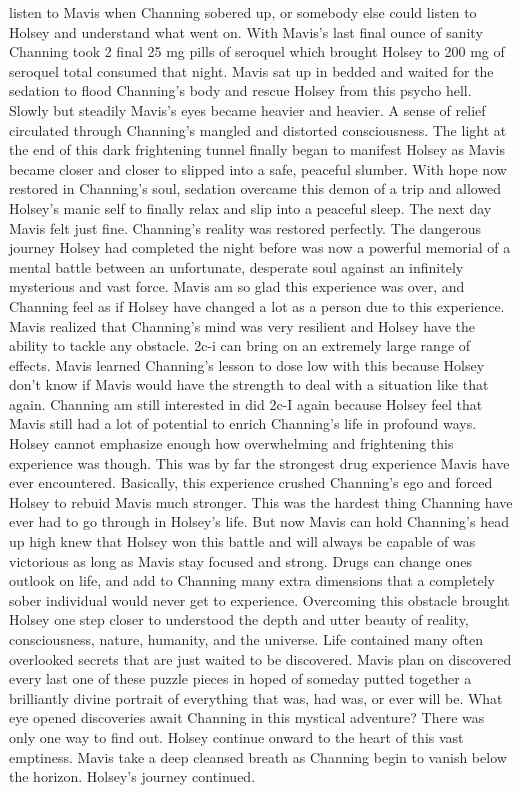 \documentclass[12pt]{book}
\begin{document}
listen to Mavis when Channing sobered up, or somebody else could listen to Holsey and understand what went on. With Mavis's last final ounce of sanity Channing took 2 final 25 mg pills of seroquel which brought Holsey to 200 mg of seroquel total consumed that night. Mavis sat up in bedded and waited for the sedation to flood Channing's body and rescue Holsey from this psycho hell. Slowly but steadily Mavis's eyes became heavier and heavier. A sense of relief circulated through Channing's mangled and distorted consciousness. The light at the end of this dark frightening tunnel finally began to manifest Holsey as Mavis became closer and closer to slipped into a safe, peaceful slumber. With hope now restored in Channing's soul, sedation overcame this demon of a trip and allowed Holsey's manic self to finally relax and slip into a peaceful sleep. The next day Mavis felt just fine. Channing's reality was restored perfectly. The dangerous journey Holsey had completed the night before was now a powerful memorial of a mental battle between an unfortunate, desperate soul against an infinitely mysterious and vast force. Mavis am so glad this experience was over, and Channing feel as if Holsey have changed a lot as a person due to this experience. Mavis realized that Channing's mind was very resilient and Holsey have the ability to tackle any obstacle. 2c-i can bring on an extremely large range of effects. Mavis learned Channing's lesson to dose low with this because Holsey don't know if Mavis would have the strength to deal with a situation like that again. Channing am still interested in did 2c-I again because Holsey feel that Mavis still had a lot of potential to enrich Channing's life in profound ways. Holsey cannot emphasize enough how overwhelming and frightening this experience was though. This was by far the strongest drug experience Mavis have ever encountered. Basically, this experience crushed Channing's ego and forced Holsey to rebuid Mavis much stronger. This was the hardest thing Channing have ever had to go through in Holsey's life. But now Mavis can hold Channing's head up high knew that Holsey won this battle and will always be capable of was victorious as long as Mavis stay focused and strong. Drugs can change ones outlook on life, and add to Channing many extra dimensions that a completely sober individual would never get to experience. Overcoming this obstacle brought Holsey one step closer to understood the depth and utter beauty of reality, consciousness, nature, humanity, and the universe. Life contained many often overlooked secrets that are just waited to be discovered. Mavis plan on discovered every last one of these puzzle pieces in hoped of someday putted together a brilliantly divine portrait of everything that was, had was, or ever will be. What eye opened discoveries await Channing in this mystical adventure? There was only one way to find out. Holsey continue onward to the heart of this vast emptiness. Mavis take a deep cleansed breath as Channing begin to vanish below the horizon. Holsey's journey continued.
\end{document}
